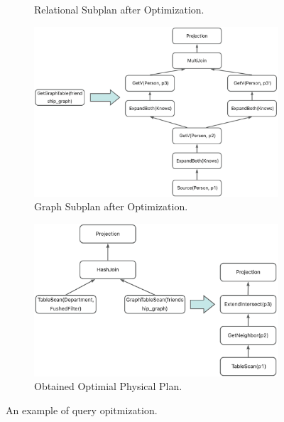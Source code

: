 \begin{figure}
\begin{subfigure}[b]{0.4\linewidth}
        \caption{Relational Subplan after Optimization.}
        \label{fig:relational-plan-optimized}
    \end{subfigure}
    \begin{subfigure}[b]{0.4\linewidth}
        \centering
        \includegraphics[width=\linewidth]{./figures/converged-logical-plan-graph-optimized.png}
        \caption{Graph Subplan after Optimization.}
        \label{fig:graph-plan-optimized}
    \end{subfigure}
    \begin{subfigure}[b]{0.4\linewidth}
        \centering
        \includegraphics[width=\linewidth]{./figures/converged-physical-plan.png}
        \caption{Obtained Optimial Physical Plan.}
        \label{fig:physical-plan-optimized}
    \end{subfigure}
    \caption{An example of query opitmization.}
    \label{fig:query-grtree-example}
\end{figure}


